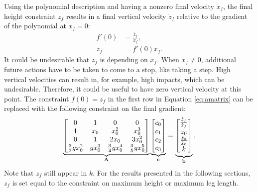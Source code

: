 Using the polynomial description and having a nonzero final velocity $\dot{x}_f$, the final height constraint $z_f$ results in a final vertical velocity $\dot{z}_f$ relative to the gradient of the polynomial at $x_f=0$:
\begin{align}
 	f'(0) &= \frac{\dot{z}_f}{\dot{x}_f},\\
 	\dot{z}_f &= f'(0)\dot{x}_f.
\end{align}
It could be undesirable that $\dot{z}_f$ is depending on $\dot{x}_f$. When $\dot{x}_f \neq 0$, additional future actions have to be taken to come to a stop, like taking a step. High vertical velocities can result in, for example, high impacts, which can be undesirable. Therefore, it could be useful to have zero vertical velocity at this point. The constraint $f(0)=z_f$ in the first row in Equation \eqref{eq:amatrix} can be replaced with the following constraint on the final gradient:
\begin{equation}
    \underbrace{\begin{bmatrix}0 & 1 & 0 & 0 \\ 
     1 & x_0 & x_0^2 & x_0^3\\
     0 & 1 & 2x_0 & 3x_0^2\\
     \frac{3}{2}gx_0^2 & gx_0^3 & \frac{3}{4}gx_0^4 & \frac{3}{5}gx_0^5\\
     \end{bmatrix}}_{\mathbf{A}}
     \underbrace{\begin{bmatrix}
     c_0\\
     c_1\\
     c_2\\
     c_3\\
     \end{bmatrix}}_{\mathbf{c}}=
     \underbrace{\begin{bmatrix}
    \frac{\dot{z}_f}{\dot{x}_f}\\ 
     z_0\\
     \frac{\dot{z}_0}{\dot{x}_0}\\
     k\\
     \end{bmatrix}}_{\mathbf{b}}
     \label{eq:a1matrix}.
\end{equation}
Note that $z_f$ still appear in $k$. For the results presented in the following sections, $z_f$ is set equal to the constraint on maximum height or maximum leg length.

